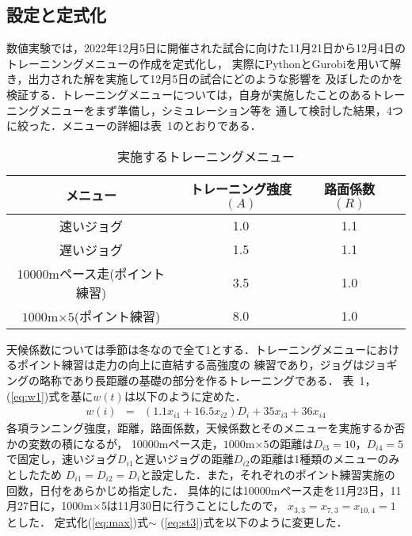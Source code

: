 \documentclass[12pt]{jarticle}
\begin{document}
\subsection{設定と定式化}
数値実験では，2022年12月5日に開催された試合に向けた11月21日から12月4日のトレーニンングメニューの作成を定式化し，
実際にPythonとGurobiを用いて解き，出力された解を実施して12月5日の試合にどのような影響を
及ぼしたのかを検証する．トレーニングメニューについては，自身が実施したことのあるトレーニングメニューをまず準備し，シミュレーション等を
通して検討した結果，4つに絞った．メニューの詳細は表\ 1のとおりである．
\begin{longtable}{|c|c|c|c|}
  \caption{実施するトレーニングメニュー}                                   \\
  \hline
  メニュー                         & トレーニング強度$(A)$ & 路面係数$(R)$ \\
  \hline
  速いジョグ                       & 1.0                   & 1.1           \\
  \hline
  遅いジョグ                       & 1.5                   & 1.1           \\
  \hline
  10000mペース走(ポイント練習)     & 3.5                   & 1.0           \\
  \hline
  $1000$m$ \times 5$(ポイント練習) & 8.0                   & 1.0           \\
  \hline
\end{longtable}
天候係数については季節は冬なので全て1とする．トレーニングメニューにおけるポイント練習は走力の向上に直結する高強度の
練習であり，ジョグはジョギングの略称であり長距離の基礎の部分を作るトレーニングである．
表\ 1，(\ref{eq:w1})式を基に$w(t)$は以下のように定めた．
\begin{eqnarray}
  w(i)&=&(1.1x_{i1}+16.5x_{i2})D_{i}+35x_{i3}+36x_{i4}\label{eq:w3}
\end{eqnarray}
各項ランニング強度，距離，路面係数，天候係数とそのメニューを実施するか否かの変数の積になるが，
10000mペース走，$1000$m$\times 5$の距離は$D_{i3}=10$，$D_{i4}=5$で固定し，速いジョグ$D_{i1}$と遅いジョグの距離$D_{i2}$の距離は1種類のメニューのみとしたため
$D_{i1}=D_{i2}=D_i$と設定した．また，それぞれのポイント練習実施の回数，日付をあらかじめ指定した．
具体的には10000mペース走を11月23日，11月27日に，1000m$\times$5は11月30日に行うことにしたので，
$x_{3,3}=x_{7,3}=x_{10,4}=1$とした．
定式化(\ref{eq:max})式$\sim$ (\ref{eq:st3})式を以下のように変更した．
\end{document}
